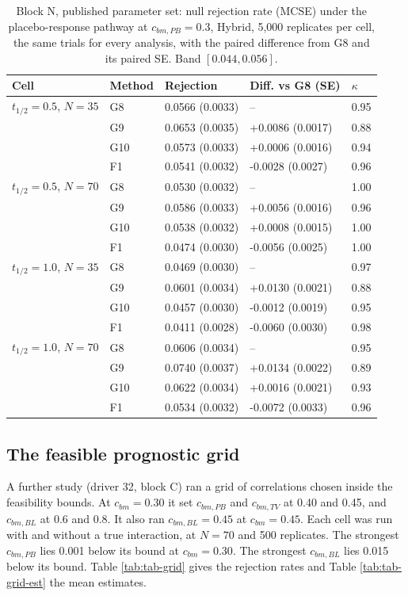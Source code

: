 \documentclass[
  11pt,
]{article}
\begin{document}
\begin{table}
\centering
\caption{\label{tab:tab-blockN}Block N, published parameter set: null
      rejection rate (MCSE) under the placebo-response pathway at
      $c_{bm,PB} = 0.3$, Hybrid, 5,000 replicates per cell, the same
      trials for every analysis, with the paired difference from G8
      and its paired SE. Band $[0.044, 0.056]$.}
\centering
\fontsize{8}{10}\selectfont
\begin{tabular}[t]{lllll}
\toprule
Cell & Method & Rejection & Diff. vs G8 (SE) & $\kappa$\\
\midrule
$t_{1/2} = 0.5$, $N = 35$ & G8 & 0.0566 (0.0033) & -- & 0.95\\
 & G9 & 0.0653 (0.0035) & +0.0086 (0.0017) & 0.88\\
 & G10 & 0.0573 (0.0033) & +0.0006 (0.0016) & 0.94\\
 & F1 & 0.0541 (0.0032) & -0.0028 (0.0027) & 0.96\\
$t_{1/2} = 0.5$, $N = 70$ & G8 & 0.0530 (0.0032) & -- & 1.00\\
 & G9 & 0.0586 (0.0033) & +0.0056 (0.0016) & 0.96\\
 & G10 & 0.0538 (0.0032) & +0.0008 (0.0015) & 1.00\\
 & F1 & 0.0474 (0.0030) & -0.0056 (0.0025) & 1.00\\
$t_{1/2} = 1.0$, $N = 35$ & G8 & 0.0469 (0.0030) & -- & 0.97\\
 & G9 & 0.0601 (0.0034) & +0.0130 (0.0021) & 0.88\\
 & G10 & 0.0457 (0.0030) & -0.0012 (0.0019) & 0.95\\
 & F1 & 0.0411 (0.0028) & -0.0060 (0.0030) & 0.98\\
$t_{1/2} = 1.0$, $N = 70$ & G8 & 0.0606 (0.0034) & -- & 0.95\\
 & G9 & 0.0740 (0.0037) & +0.0134 (0.0022) & 0.89\\
 & G10 & 0.0622 (0.0034) & +0.0016 (0.0021) & 0.93\\
 & F1 & 0.0534 (0.0032) & -0.0072 (0.0033) & 0.96\\
\bottomrule
\end{tabular}
\end{table}

\subsection{The feasible prognostic grid}\label{sec-grid}

A further study (driver 32, block C) ran a grid of correlations
chosen inside the feasibility bounds. At \(c_{bm} = 0.30\) it set \(c_{bm,PB}\) and
\(c_{bm,TV}\) at 0.40 and 0.45, and \(c_{bm,BL}\) at 0.6 and 0.8. It also
ran \(c_{bm,BL} = 0.45\) at \(c_{bm} = 0.45\). Each cell was run with and
without a true interaction, at \(N = 70\) and 500 replicates.
The strongest \(c_{bm,PB}\) lies 0.001 below its bound at
\(c_{bm} = 0.30\). The strongest \(c_{bm,BL}\) lies 0.015
below its bound. Table \ref{tab:tab-grid} gives the rejection rates
and Table \ref{tab:tab-grid-est} the mean estimates.
\end{document}
